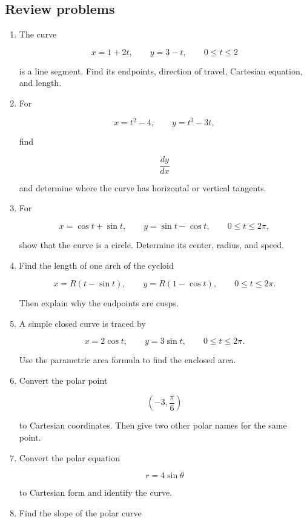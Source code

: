 \subsection{Review problems}
\label{subsec:chapter-14-review-problems}

\begin{enumerate}
\item The curve

\[
x=1+2t,
\qquad
y=3-t,
\qquad
0\le t\le2
\]

is a line segment.  Find its endpoints, direction of travel, Cartesian equation, and length.

\item For

\[
x=t^2-4,
\qquad
y=t^3-3t,
\]

find

\[
\frac{dy}{dx}
\]

and determine where the curve has horizontal or vertical tangents.

\item For

\[
x=\cos t+\sin t,
\qquad
y=\sin t-\cos t,
\qquad
0\le t\le2\pi,
\]

show that the curve is a circle.  Determine its center, radius, and speed.

\item Find the length of one arch of the cycloid

\[
x=R(t-\sin t),
\qquad
y=R(1-\cos t),
\qquad
0\le t\le2\pi.
\]

Then explain why the endpoints are cusps.

\item A simple closed curve is traced by

\[
x=2\cos t,
\qquad
y=3\sin t,
\qquad
0\le t\le2\pi.
\]

Use the parametric area formula to find the enclosed area.

\item Convert the polar point

\[
\left(-3,\frac{\pi}{6}\right)
\]

to Cartesian coordinates.  Then give two other polar names for the same point.

\item Convert the polar equation

\[
r=4\sin\theta
\]

to Cartesian form and identify the curve.

\item Find the slope of the polar curve


\end{enumerate}
